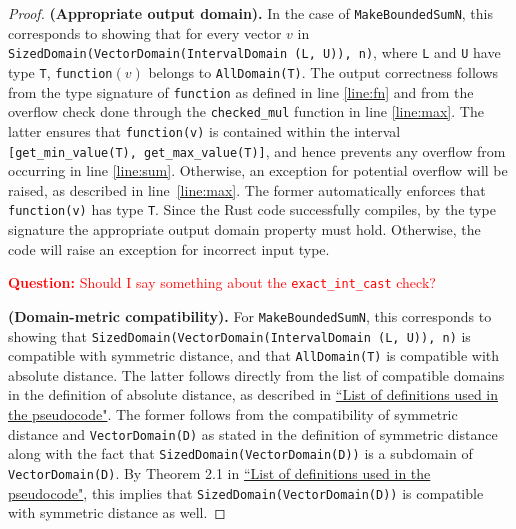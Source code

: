 \documentclass[11pt,a4paper]{article}
\theoremstyle{definition}
\newcommand{\questionc}[1]{\textcolor{red}{\textbf{Question:} #1}}
\newcommand{\silvia}[1]{{ {\color{blue}{(silvia)~#1}}}}
\begin{document}
\begin{proof}
    \textbf{(Appropriate output domain).} In the case of \texttt{MakeBoundedSumN}, this corresponds to showing that for every vector $v$ in \texttt{SizedDomain(VectorDomain(IntervalDomain (L, U)), n)}, where \texttt{L} and \texttt{U} have type \texttt{T}, \texttt{function}$(v)$ belongs to \texttt{AllDomain(T)}.
    The output correctness follows from the type signature of \texttt{function} as defined in line \ref{line:fn} and from the overflow check done through the \texttt{checked\_mul} function in line \ref{line:max}. The latter ensures that \texttt{function(v)} is contained within the interval \texttt{[get\_min\_value(T), get\_max\_value(T)]}, and hence prevents any overflow from occurring in line \ref{line:sum}. Otherwise, an exception for potential overflow will be raised, as described in line~\ref{line:max}. The former automatically enforces that \texttt{function(v)} has type \texttt{T}. Since the Rust code successfully compiles, by the type signature the appropriate output domain property must hold. Otherwise, the code will raise an exception for incorrect input type.
    
    \questionc{Should I say something about the \texttt{exact\_int\_cast} check?}
    
    \smallskip
    \textbf{(Domain-metric compatibility).} For \texttt{MakeBoundedSumN}, this corresponds to showing that \texttt{SizedDomain(VectorDomain(IntervalDomain (L, U)), n)} is compatible with symmetric distance, and that \texttt{AllDomain(T)} is compatible with absolute distance. The latter follows directly from the list of compatible domains in the definition of absolute distance, as described in \href{https://www.overleaf.com/project/60d215bf90b337ac02200a99}{``List of definitions used in the pseudocode"}. The former follows from the compatibility of symmetric distance and \texttt{VectorDomain(D)} as stated in the definition of symmetric distance along with the fact that \texttt{SizedDomain(VectorDomain(D))} is a subdomain of \texttt{VectorDomain(D)}. By Theorem 2.1 in \href{https://www.overleaf.com/project/60d215bf90b337ac02200a99}{``List of definitions used in the pseudocode"}, this implies that \texttt{SizedDomain(VectorDomain(D))} is compatible with symmetric distance as well. 
    
    \silvia{Flag: this is an example of the subdomain issues that we have been discussing during the week of July 19. Hence this paragraph might need some phrasing updates when the compatibility pairing constructor and the subdomain trait are implemented.}
    

\end{proof}
\end{document}
